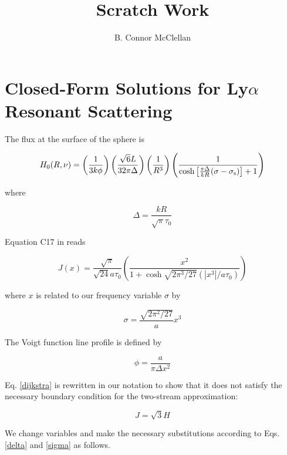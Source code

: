 \documentclass[onecolumn]{aastex63}
\begin{document}
\title{Scratch Work}
\author{B. Connor McClellan}
\keywords{}

\setlength\parindent{0pt}

\section{Closed-Form Solutions for Ly$\alpha$ Resonant Scattering}

The flux at the surface of the sphere is 

\begin{equation}\label{eq:H0surf}
H_0(R,\nu)  =  \left( \frac{1}{3k\phi} \right)
\left( \frac{\sqrt{6}L}{32\pi \Delta} \right)
\left( \frac{1}{R^3} \right)
\left( 
\frac{ 1 }{ \cosh \left[ \frac{\pi \Delta}{k R} (\sigma - \sigma_{\rm s}) \right] +1 }
\right)
\end{equation}

where

\begin{equation} \label{delta}
    \Delta = \frac{kR}{\sqrt{\pi}\tau_0}
\end{equation}

Equation C17 in \citet{2006ApJ...649...14D} reads

\begin{equation} \label{dijkstra}
    J(x) = \frac{\sqrt{\pi}}{\sqrt{24}a\tau_0}\left(\frac{x^2}{1 + \cosh{\sqrt{2\pi^3/27}(|x^3|/a\tau_0)}}\right)
\end{equation}

where $x$ is related to our frequency variable $\sigma$ by 

\begin{equation} \label{sigma}
    \sigma = \frac{\sqrt{2\pi^2/27}}{a} x^3
\end{equation}

The Voigt function line profile is defined by

\begin{equation} \label{lineprofile}
    \phi = \frac{a}{\pi\Delta x^2}
\end{equation}

Eq. \ref{dijkstra} is rewritten in our notation to show that it does not satisfy the necessary boundary condition for the two-stream approximation:

\begin{equation}
    J = \sqrt{3} H
\end{equation}

We change variables and make the necessary substitutions according to Eqs. \ref{delta} and \ref{sigma} as follows.
\end{document}
